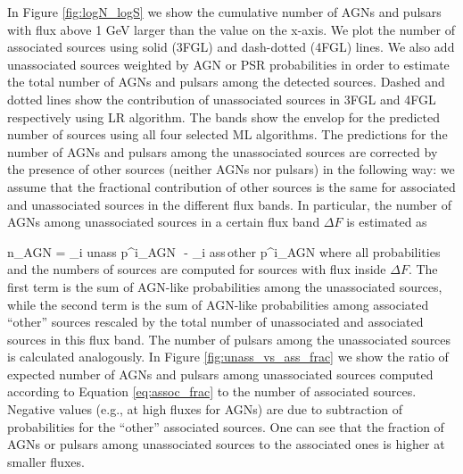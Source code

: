 In Figure \ref{fig:logN_logS} we show the cumulative number of AGNs and pulsars with flux above 1 GeV larger than the
value on the x-axis.
We plot the number of associated sources using solid (3FGL) and dash-dotted (4FGL) lines.
We also add unassociated sources weighted by AGN or PSR probabilities in order to estimate the total number of AGNs and pulsars
among the detected sources.
Dashed and dotted lines show the contribution of unassociated sources in 3FGL and 4FGL respectively using LR algorithm.
The bands show the envelop for the predicted number of sources using all four selected ML algorithms.
The predictions for the number of AGNs and pulsars among the unassociated sources are corrected by the presence of other sources (neither AGNs nor pulsars) in the following way:
we assume that the fractional contribution of other sources is the same for associated and unassociated sources in the different flux bands.
In particular, the number of AGNs among unassociated sources in a certain flux band $\Delta F$ is estimated as

\be
{}
n_{\rm AGN} = \sum_{i \in \rm unass} p^i_{\rm AGN}\,\, - \sum_{i \in \rm ass\,other} p^i_{\rm AGN} \cdot 
{}
\ee
where all probabilities and the numbers of sources are computed for sources with flux inside $\Delta F$.
The first term is the sum of AGN-like probabilities among the unassociated sources,
while the second term is the sum of AGN-like probabilities among associated ``other'' sources rescaled by the total number
of unassociated and associated sources in this flux band.
The number of pulsars among the unassociated sources is calculated analogously.
In Figure \ref{fig:unass_vs_ass_frac} we show the ratio of expected number of AGNs and pulsars among unassociated sources computed according to Equation \ref{eq:assoc_frac} to the number of associated sources.
Negative values (e.g., at high fluxes for AGNs) are due to subtraction of probabilities for the ``other'' associated sources.
One can see that the fraction of AGNs or pulsars among unassociated sources to the associated ones is higher at smaller fluxes.

